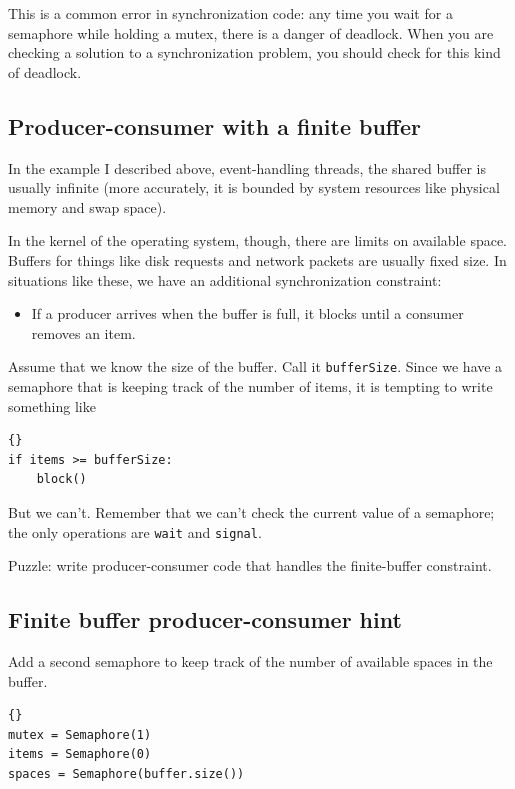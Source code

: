 \documentclass{book}
\begin{document}
This is a common error in synchronization code: any time
you wait for a semaphore while holding a mutex, there is
a danger of deadlock.  When you are checking a solution to
a synchronization problem, you should check for this kind
of deadlock.


\subsection{Producer-consumer with a finite buffer}

In the example I described above, event-handling threads,
the shared buffer is usually infinite (more accurately, it is
bounded by system resources like physical memory and swap
space).

In the kernel of the operating system, though, there are
limits on available space.  Buffers for things like disk
requests and network packets are usually fixed size.  In
situations like these, we have an additional synchronization
constraint:

\begin{itemize}

    \item If a producer arrives when the buffer is full, it
          blocks until a consumer removes an item.

\end{itemize}

Assume that we know the size of the buffer.  Call it
    {\tt bufferSize}.  Since we have a semaphore that is keeping
track of the number of items, it is tempting to write something
like

\begin{lstlisting}[title={Broken finite buffer solution}]{}
if items >= bufferSize:
    block()
\end{lstlisting}

But we can't.  Remember that we can't check the current
value of a semaphore; the only operations are {\tt wait}
and {\tt signal}.

Puzzle: write producer-consumer code that handles the finite-buffer
constraint.


\subsection{Finite buffer producer-consumer hint}

Add a second semaphore to keep track of the number of
available spaces in the buffer.

\begin{lstlisting}[title={Finite-buffer producer-consumer initialization}]{}
mutex = Semaphore(1)
items = Semaphore(0)
spaces = Semaphore(buffer.size())
\end{lstlisting}
\end{document}
